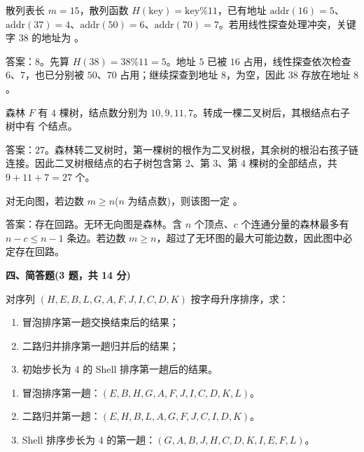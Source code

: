 \begin{question}
散列表长 $m=15$，散列函数 $H(\mathrm{key})=\mathrm{key}\%11$，已有地址 $\mathrm{addr}(16)=5$、$\mathrm{addr}(37)=4$、$\mathrm{addr}(50)=6$、$\mathrm{addr}(70)=7$。若用线性探查处理冲突，关键字 $38$ 的地址为 \blank。
\begin{solution}
答案：$8$。先算 $H(38)=38\%11=5$。地址 $5$ 已被 $16$ 占用，线性探查依次检查 $6$、$7$，也已分别被 $50$、$70$ 占用；继续探查到地址 $8$，为空，因此 $38$ 存放在地址 $8$。
\end{solution}
\end{question}

\begin{question}
森林 $F$ 有 $4$ 棵树，结点数分别为 $10,9,11,7$。转成一棵二叉树后，其根结点右子树中有 \blank 个结点。
\begin{solution}
答案：$27$。森林转二叉树时，第一棵树的根作为二叉树根，其余树的根沿右孩子链连接。因此二叉树根结点的右子树包含第 $2$、第 $3$、第 $4$ 棵树的全部结点，共 $9+11+7=27$ 个。
\end{solution}
\end{question}

\begin{question}
对无向图，若边数 $m\ge n$($n$ 为结点数)，则该图一定 \blank。
\begin{solution}
答案：存在回路。无环无向图是森林。含 $n$ 个顶点、$c$ 个连通分量的森林最多有 $n-c\le n-1$ 条边。若边数 $m\ge n$，超过了无环图的最大可能边数，因此图中必定存在回路。
\end{solution}
\end{question}

\textbf{四、简答题(3 题，共 14 分)}
\begin{question}
对序列 $(H,E,B,L,G,A,F,J,I,C,D,K)$ 按字母升序排序，求：
\begin{enumerate}
  \item 冒泡排序第一趟交换结束后的结果；
  \item 二路归并排序第一趟归并后的结果；
  \item 初始步长为 $4$ 的 Shell 排序第一趟后的结果。
\end{enumerate}
\begin{solution}
\begin{enumerate}
  \item 冒泡排序第一趟：$(E,B,H,G,A,F,J,I,C,D,K,L)$。
  \item 二路归并第一趟：$(E,H,B,L,A,G,F,J,C,I,D,K)$。
  \item Shell 排序步长为 $4$ 的第一趟：$(G,A,B,J,H,C,D,K,I,E,F,L)$。
\end{enumerate}
\end{solution}
\end{question}


